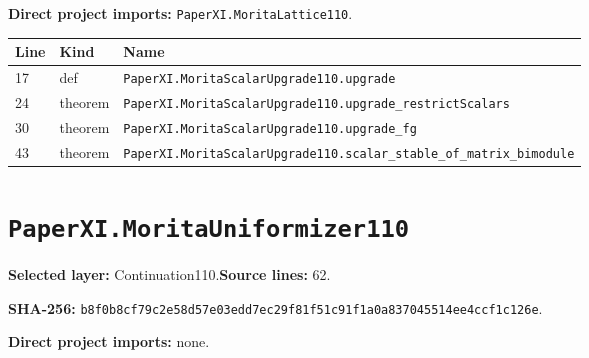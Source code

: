 \documentclass[10pt,oneside]{book}
\begin{document}

\textbf{Direct project imports:} \nolinkurl{PaperXI.MoritaLattice110}.

\begin{longtable}{@{}p{}p{}p{}@{}}\toprule Line&Kind&Name\\\midrule\endhead

17&def&\nolinkurl{PaperXI.MoritaScalarUpgrade110.upgrade}\\

24&theorem&\nolinkurl{PaperXI.MoritaScalarUpgrade110.upgrade_restrictScalars}\\

30&theorem&\nolinkurl{PaperXI.MoritaScalarUpgrade110.upgrade_fg}\\

43&theorem&\nolinkurl{PaperXI.MoritaScalarUpgrade110.scalar_stable_of_matrix_bimodule}\\

\bottomrule\end{longtable}

\section{\texorpdfstring{\nolinkurl{PaperXI.MoritaUniformizer110}}{PaperXI.MoritaUniformizer110}}\label{module:PaperXI.MoritaUniformizer110}

\textbf{Selected layer:} Continuation110.\quad\textbf{Source lines:} 62.\par\textbf{SHA-256:} {\scriptsize\nolinkurl{b8f0b8cf79c2e58d57e03edd7ec29f81f51c91f1a0a837045514ee4ccf1c126e}}.


\textbf{Direct project imports:} none.
\end{document}
